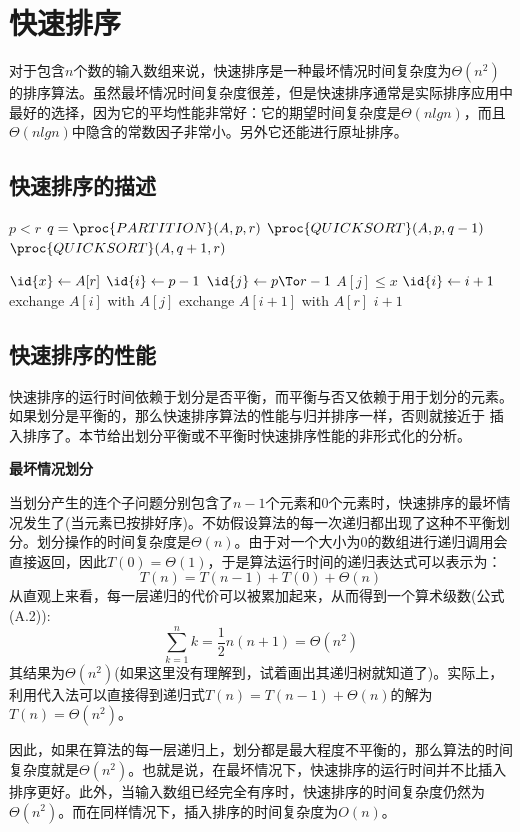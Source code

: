 \documentclass[a4paper,11pt]{ctexbook}
\begin{document}
\setcounter{chapter}{6}
\chapter{快速排序}
对于包含$ n $个数的输入数组来说，快速排序是一种最坏情况时间复杂度为$ \Theta(n^2) $的排序算法。虽然最坏情况时间复杂度很差，但是快速排序通常是实际排序应用中最好的选择，因为它的平均性能非常好：它的期望时间复杂度是$ \Theta(nlgn) $，而且$ \Theta(nlgn) $中隐含的常数因子非常小。另外它还能进行原址排序。
\section{快速排序的描述}
\begin{codebox}
	\li \If$ p < r $
	\li \Then 
	$ q = \proc{PARTITION}(A,p,r) $
	\li $ \proc{QUICKSORT}(A,p,q-1)$
	\li $ \proc{QUICKSORT}(A,q+1,r)$
	\End
\end{codebox}
\begin{codebox}
	\li $ \id{x} \gets A[r] $
	\li $ \id{i} \gets p-1 $
	\li \For$ \id{j} \gets p \To r-1 $
	\li \Do
	\If $ A[j] \leq x $
	\li 		\Then
	$ \id{i} \gets i+1 $
	\li 			exchange  $ A[i]$ with $A[j]$
	\End
	\End
	\li exchange $A[i+1]$ with $A[r] $
	\li \Return $ i+1 $
\end{codebox}
\section{快速排序的性能}
快速排序的运行时间依赖于划分是否平衡，而平衡与否又依赖于用于划分的元素。如果划分是平衡的，那么快速排序算法的性能与归并排序一样，否则就接近于 插入排序了。本节给出划分平衡或不平衡时快速排序性能的非形式化的分析。

\textbf{最坏情况划分}

当划分产生的连个子问题分别包含了$ n-1 $个元素和$ 0 $个元素时，快速排序的最坏情况发生了(当元素已按排好序)。不妨假设算法的每一次递归都出现了这种不平衡划分。划分操作的时间复杂度是$ \Theta(n) $。由于对一个大小为0的数组进行递归调用会直接返回，因此$ T(0) = \Theta(1) $，于是算法运行时间的递归表达式可以表示为：
\[
	T(n) = T(n-1) + T(0) + \Theta(n)
\]
从直观上来看，每一层递归的代价可以被累加起来，从而得到一个算术级数(公式(A.2)):
\[
	\sum_{k=1}^{n}k=\frac{1}{2}n(n+1)=\Theta(n^2)
\]
其结果为$ \Theta(n^2) $(如果这里没有理解到，试着画出其递归树就知道了)。实际上，利用代入法可以直接得到递归式$ T(n)=T(n-1)+\Theta(n) $的解为$ T(n)=\Theta(n^2) $。

因此，如果在算法的每一层递归上，划分都是最大程度不平衡的，那么算法的时间复杂度就是$ \Theta(n^2) $。也就是说，在最坏情况下，快速排序的运行时间并不比插入排序更好。此外，当输入数组已经完全有序时，快速排序的时间复杂度仍然为$ \Theta(n^2) $。而在同样情况下，插入排序的时间复杂度为$ O(n) $。
\end{document}
